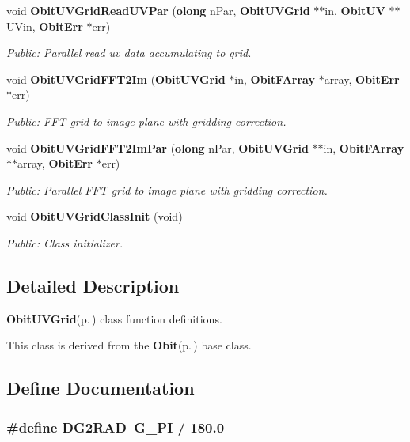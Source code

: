 \begin{CompactItemize}
void {\bf Obit\-UVGrid\-Read\-UVPar} ({\bf olong} n\-Par, {\bf Obit\-UVGrid} $\ast$$\ast$in, {\bf Obit\-UV} $\ast$$\ast$UVin, {\bf Obit\-Err} $\ast$err)
\begin{CompactList}\small\item\em Public: Parallel read uv data accumulating to grid. \item\end{CompactList}\item 
void {\bf Obit\-UVGrid\-FFT2Im} ({\bf Obit\-UVGrid} $\ast$in, {\bf Obit\-FArray} $\ast$array, {\bf Obit\-Err} $\ast$err)
\begin{CompactList}\small\item\em Public: FFT grid to image plane with gridding correction. \item\end{CompactList}\item 
void {\bf Obit\-UVGrid\-FFT2Im\-Par} ({\bf olong} n\-Par, {\bf Obit\-UVGrid} $\ast$$\ast$in, {\bf Obit\-FArray} $\ast$$\ast$array, {\bf Obit\-Err} $\ast$err)
\begin{CompactList}\small\item\em Public: Parallel FFT grid to image plane with gridding correction. \item\end{CompactList}\item 
void {\bf Obit\-UVGrid\-Class\-Init} (void)
\begin{CompactList}\small\item\em Public: Class initializer. \item\end{CompactList}\end{CompactItemize}


\subsection{Detailed Description}
{\bf Obit\-UVGrid}{\rm (p.\,\pageref{structObitUVGrid})} class function definitions. 

This class is derived from the {\bf Obit}{\rm (p.\,\pageref{structObit})} base class.

\subsection{Define Documentation}
\subsubsection{\setlength{\rightskip}{0pt plus 5cm}\#define DG2RAD\ G\_\-PI / 180.0}\label{ObitUVGrid_8c_a0}


